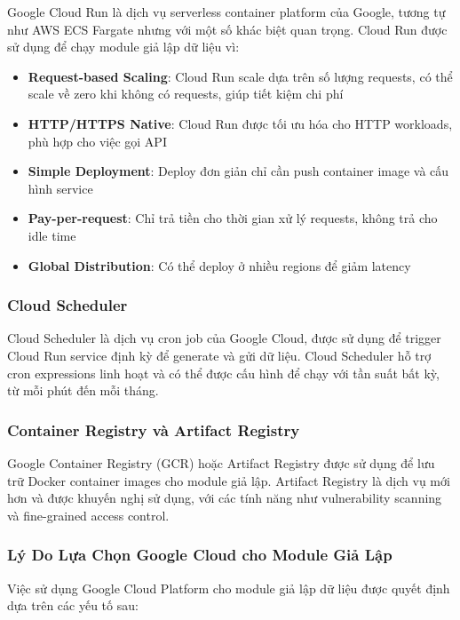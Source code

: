 Google Cloud Run là dịch vụ serverless container platform của Google, tương tự như AWS ECS Fargate nhưng với một số khác biệt quan trọng. Cloud Run được sử dụng để chạy module giả lập dữ liệu vì:

\begin{itemize}
    \item \textbf{Request-based Scaling}: Cloud Run scale dựa trên số lượng requests, có thể scale về zero khi không có requests, giúp tiết kiệm chi phí
    \item \textbf{HTTP/HTTPS Native}: Cloud Run được tối ưu hóa cho HTTP workloads, phù hợp cho việc gọi API
    \item \textbf{Simple Deployment}: Deploy đơn giản chỉ cần push container image và cấu hình service
    \item \textbf{Pay-per-request}: Chỉ trả tiền cho thời gian xử lý requests, không trả cho idle time
    \item \textbf{Global Distribution}: Có thể deploy ở nhiều regions để giảm latency
\end{itemize}

\subsubsection{Cloud Scheduler}

Cloud Scheduler là dịch vụ cron job của Google Cloud, được sử dụng để trigger Cloud Run service định kỳ để generate và gửi dữ liệu. Cloud Scheduler hỗ trợ cron expressions linh hoạt và có thể được cấu hình để chạy với tần suất bất kỳ, từ mỗi phút đến mỗi tháng.

\subsubsection{Container Registry và Artifact Registry}

Google Container Registry (GCR) hoặc Artifact Registry được sử dụng để lưu trữ Docker container images cho module giả lập. Artifact Registry là dịch vụ mới hơn và được khuyến nghị sử dụng, với các tính năng như vulnerability scanning và fine-grained access control.

\subsubsection{Lý Do Lựa Chọn Google Cloud cho Module Giả Lập}

Việc sử dụng Google Cloud Platform cho module giả lập dữ liệu được quyết định dựa trên các yếu tố sau:

